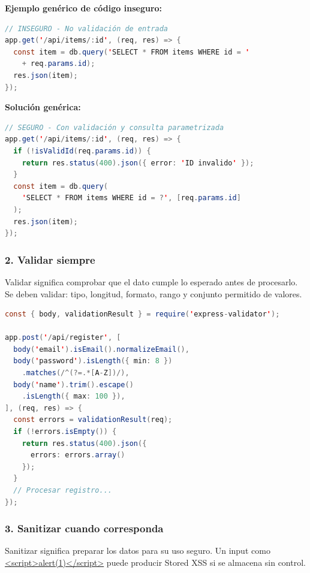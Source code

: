 \textbf{Ejemplo genérico de código inseguro:}

\begin{lstlisting}[language=Java, caption={Código inseguro: sin validación de entrada}]
// INSEGURO - No validación de entrada
app.get('/api/items/:id', (req, res) => {
  const item = db.query('SELECT * FROM items WHERE id = '
    + req.params.id);
  res.json(item);
});
\end{lstlisting}

\textbf{Solución genérica:}

\begin{lstlisting}[language=Java, caption={Código seguro: con validación de entrada}]
// SEGURO - Con validación y consulta parametrizada
app.get('/api/items/:id', (req, res) => {
  if (!isValidId(req.params.id)) {
    return res.status(400).json({ error: 'ID invalido' });
  }
  const item = db.query(
    'SELECT * FROM items WHERE id = ?', [req.params.id]
  );
  res.json(item);
});
\end{lstlisting}

\subsubsection{2. Validar siempre}

Validar significa comprobar que el dato cumple lo esperado antes de procesarlo. Se deben validar: tipo, longitud, formato, rango y conjunto permitido de valores.

\begin{lstlisting}[language=Java, caption={Ejemplo genérico de validación de entrada}]
const { body, validationResult } = require('express-validator');

app.post('/api/register', [
  body('email').isEmail().normalizeEmail(),
  body('password').isLength({ min: 8 })
    .matches(/^(?=.*[A-Z])/),
  body('name').trim().escape()
    .isLength({ max: 100 }),
], (req, res) => {
  const errors = validationResult(req);
  if (!errors.isEmpty()) {
    return res.status(400).json({
      errors: errors.array()
    });
  }
  // Procesar registro...
});
\end{lstlisting}

\subsubsection{3. Sanitizar cuando corresponda}

Sanitizar significa preparar los datos para su uso seguro. Un input como \url{<script>alert(1)</script>} puede producir Stored XSS si se almacena sin control.

